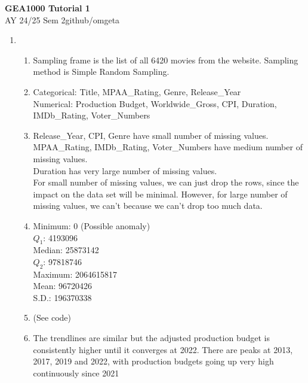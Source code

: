 \documentclass[12pt, a4paper]{article}
\newcommand{\mytitle}{GEA1000 Tutorial 1}
\newcommand{\myauthor}{github/omgeta}
\newcommand{\mydate}{AY 24/25 Sem 2}
\begin{document}
\raggedright
\footnotesize
\begin{center}
{\normalsize{\textbf{\mytitle}}} \\
{\footnotesize{\mydate\hspace{2pt}\textemdash\hspace{2pt}\myauthor}}
\end{center}
\begin{enumerate}[Q\arabic*.]
  \item
    \begin{enumerate}[(\alph*.)]
      \item Sampling frame is the list of all 6420 movies from the website. Sampling method is Simple Random Sampling.
      \item Categorical: Title, MPAA\_Rating, Genre, Release\_Year\\
        Numerical: Production Budget, Worldwide\_Gross, CPI, Duration, IMDb\_Rating, Voter\_Numbers

      \item Release\_Year, CPI, Genre have small number of missing values.\\MPAA\_Rating, IMDb\_Rating, Voter\_Numbers have medium number of missing values.\\Duration has very large number of missing values.\\
        For small number of missing values, we can just drop the rows, since the impact on the data set will be minimal. However, for large number of missing values, we can't because we can't drop too much data.

      \item Minimum: 0 (Possible anomaly)\\
        $Q_1$: 4193096\\
        Median: 25873142\\
        $Q_2$: 97818746\\
        Maximum: 2064615817\\
        Mean: 96720426\\
        S.D.: 196370338\\

      \item (See code)

      \item The trendlines are similar but the adjusted production budget is consistently higher until it converges at 2022. There are peaks at 2013, 2017, 2019 and 2022, with production budgets going up very high continuously since 2021\vspace{1em}


\end{enumerate}
\end{enumerate}
\end{document}
